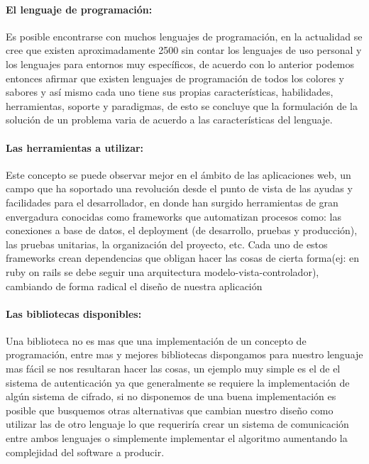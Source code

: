 \paragraph{El lenguaje de programación:}
Es posible encontrarse con muchos lenguajes de programación, en la actualidad se cree que existen aproximadamente 2500 \cite{bd_lenguajes_programacion} sin contar los lenguajes de uso personal y los lenguajes para entornos muy específicos, de acuerdo con lo anterior podemos entonces afirmar que existen lenguajes de programación de todos los colores y sabores y así mismo cada uno tiene sus propias características, habilidades, herramientas, soporte y paradigmas, de esto se concluye que la formulación de la solución de un problema varia de acuerdo a las características del lenguaje.


\paragraph{Las herramientas a utilizar:}
Este concepto se puede observar mejor en el ámbito de las aplicaciones web, un campo que ha soportado una revolución desde el punto de vista de las ayudas y facilidades para el desarrollador, en donde han surgido herramientas de gran envergadura conocidas como frameworks que automatizan procesos como: las conexiones a base de datos, el deployment (de desarrollo, pruebas y producción), las pruebas unitarias, la organización del proyecto, etc. Cada uno de estos frameworks crean dependencias que obligan hacer las cosas de cierta forma(ej: en ruby on rails se debe seguir una arquitectura modelo-vista-controlador), cambiando de forma radical el diseño de nuestra aplicación

\paragraph{Las bibliotecas disponibles:}
Una biblioteca no es mas que una implementación de un concepto de programación, entre mas y mejores bibliotecas dispongamos para nuestro lenguaje mas fácil se nos resultaran hacer las cosas, un ejemplo muy simple es el de el sistema de autenticación ya que generalmente se requiere la implementación de algún sistema de cifrado, si no disponemos de una buena implementación es posible que busquemos otras alternativas que cambian nuestro diseño como utilizar las de otro lenguaje lo que requeriría crear un sistema de comunicación entre ambos lenguajes o simplemente implementar el algoritmo aumentando la complejidad del software a producir.

